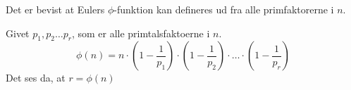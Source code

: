     Det er bevist at Eulers \(\phi\)-funktion kan defineres ud fra alle primfaktorerne i \(n\).

    \begin{sent}
        Givet \(p_1, p_2 \hdots p_r\), som er alle primtalsfaktoerne i \(n\).
        \[\phi(n) = n \cdot \left(1-\frac{1}{p_1}\right) \cdot \left(1-\frac{1}{p_2}\right) \cdot \hdots \cdot \left(1-\frac{1}{p_r}\right)\]
        Det ses da, at \(r = \phi(n)\)
    \end{sent}
